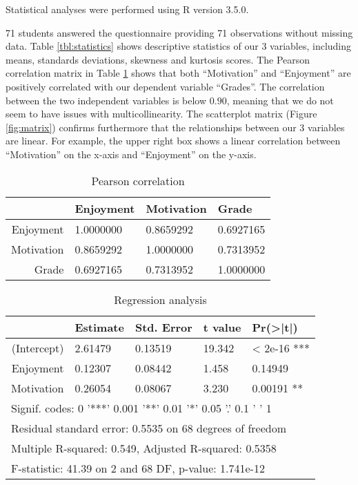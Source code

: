 \documentclass[sigconf]{acmart}
\begin{document}
Statistical analyses were performed using R version 3.5.0.

71 students answered the questionnaire providing 71 observations without
missing data. Table \ref{tbl:statistics} shows descriptive statistics of
our 3 variables, including means, standards deviations, skewness and
kurtosis scores. The Pearson correlation matrix in Table
\ref{tbl:pearson} shows that both ``Motivation'' and ``Enjoyment'' are
positively correlated with our dependent variable ``Grades''. The
correlation between the two independent variables is below \(0.90\),
meaning that we do not seem to have issues with multicollinearity. The
scatterplot matrix (Figure \ref{fig:matrix}) confirms furthermore that
the relationships between our 3 variables are linear. For example, the
upper right box shows a linear correlation between ``Motivation'' on the
x-axis and ``Enjoyment'' on the y-axis.

\begin{table}[t]
\begin{tabular}{|r|l|l|l|}
\hline
 & Enjoyment & Motivation & Grade \\
 \hline
 Enjoyment & 1.0000000 & 0.8659292 & 0.6927165\\
 \hline
 Motivation & 0.8659292 & 1.0000000 & 0.7313952 \\
 \hline
 Grade & 0.6927165  & 0.7313952 & 1.0000000 \\
 \hline
\end{tabular}
\caption{\label{tbl:pearson}Pearson correlation}
\end{table}

\begin{table}
\begin{tabular}{|r|l|l|l|l|}
\hline
& Estimate & Std. Error & t value & Pr(>|t|)  \\
 \hline
(Intercept)  & 2.61479 &   0.13519  & 19.342 & < 2e-16 *** \\
 \hline
Enjoyment &        0.12307 &    0.08442 &   1.458 &  0.14949     \\
 \hline
Motivation &   0.26054 &    0.08067 &   3.230 &  0.00191 **  \\
 \hline
 \multicolumn{5}{|l|}{ Signif. codes:  0 '***' 0.001 '**' 0.01 '*' 0.05 '.' 0.1 ' ' 1} \\
 \hline
 \multicolumn{5}{|l|}{Residual standard error: 0.5535 on 68 degrees of freedom} \\
 \multicolumn{5}{|l|}{Multiple R-squared:  0.549,   Adjusted R-squared:  0.5358 } \\
 \multicolumn{5}{|l|}{ F-statistic: 41.39 on 2 and 68 DF,  p-value: 1.741e-12}\\
 \hline
\end{tabular}
\caption{\label{tbl:regression}Regression analysis}
\end{table}
\end{document}
